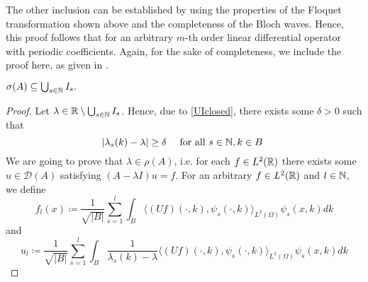 The other inclusion can be established by using the properties of the Floquet transformation shown above and the completeness of the Bloch waves. Hence, this proof follows that for an arbitrary $m$-th order linear differential operator with periodic coefficients. Again, for the sake of completeness, we include the proof here, as given in \cite[Chap. 3.6]{dorfler2011photonic}.

 \begin{theorem} \label{4.1:thm-MainResult.SecondInclusion}

	$\sigma(A) \subseteq \bigcup_{s \in \mathbb{N}} I_{s}.$

	\begin{proof}
		Let $\lambda \in \mathbb{R} \setminus \bigcup_{s \in \mathbb{N}} I_{s}$. Hence, due to \eqref{UIclosed}, there exists some $\delta > 0$ such that
			\begin{equation}
				|\lambda_{s}(k) - \lambda| \geq \delta \quad \text{ for all } s \in \N, k \in B \label{lambda-distance}
			\end{equation}
		We are going to prove that $\lambda \in \rho(A)$, i.e. for each $f \in L^{2}(\mathbb{R})$ there exists some $u \in \mathcal{D}(A)$ satisfying $(A-\lambda I)u = f$. For an arbitrary $f \in L^{2}(\mathbb{R})$ and $l \in \mathbb{N}$, we define 
			\[ f_{l}(x) \coloneqq \frac{1}{\sqrt{|B|}} \sum_{s=1}^{l} \int_{B} \langle (Uf)(\cdot, k), \psi_{s}(\cdot, k)\rangle_{L^{2}(\Omega)} \psi_{s}(x,k) dk \]
			and
			\begin{equation}
				u_{l} \coloneqq \frac{1}{\sqrt{|B|}} \sum_{s=1}^{l} \int_{B} \frac{1}{\lambda_{s}(k) - \lambda} \langle (Uf)(\cdot, k), \psi_{s}(\cdot, k)\rangle_{L^{2}(\Omega)} \psi_{s}(x, k) dk \label{ul}
			\end{equation} 


\end{proof}
\end{theorem}
